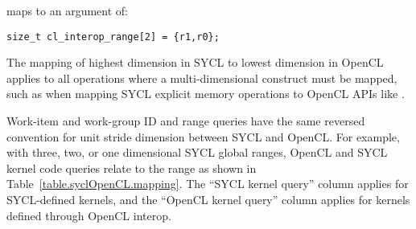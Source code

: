 maps to an   argument
of:

\begin{lstlisting}[style=nonumbers]
size_t cl_interop_range[2] = {r1,r0};
\end{lstlisting}

The mapping of highest dimension in SYCL to lowest dimension in OpenCL applies to all
operations where a multi-dimensional construct must be mapped, such as when mapping SYCL
explicit memory operations to OpenCL APIs like .

Work-item and work-group ID and range queries have the same reversed convention for unit
stride dimension between SYCL and OpenCL.  For example, with three, two, or one dimensional SYCL
global ranges, OpenCL and SYCL kernel code queries relate to the range as shown in Table~\ref{table.syclOpenCL.mapping}.
The ``SYCL kernel query'' column applies for SYCL-defined kernels, and the ``OpenCL kernel query'' column
applies for kernels defined through OpenCL interop.

